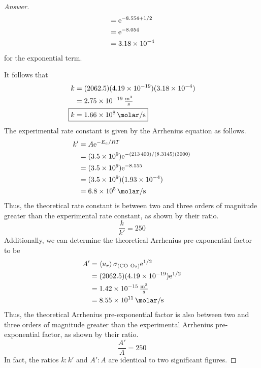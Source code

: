 \documentclass[../psets.tex]{subfiles}
\begin{document}
\begin{enumerate}[label={\textbf{30-\arabic*.}},leftmargin=3.5em]
\begin{proof}[Answer]
\begin{align*}
            &= \e[-\num{8.554}+1/2]\\
            &= \e[-\num{8.054}]\\
            &= \num{3.18e-4}
        \end{align*}
        for the exponential term.\par
        \pagebreak
        It follows that
        \begin{align*}
            k &= (\num{2062.5})(\num{4.19e-19})(\num{3.18e-4})\\
            &= \SI[per-mode=fraction,fraction-function=\tfrac]{2.75e-19}{\cubic\meter\per\second}\\
            \Aboxed{k &= \SI{1.66e8}{\per\molar\per\second}}
        \end{align*}
        The experimental rate constant is given by the Arrhenius equation as follows.
        \begin{align*}
            k' &= A\e[-E_a/RT]\\
            &= (\num{3.5e9})\e[-(\num{213400})/(\num{8.3145})(\num{3000})]\\
            &= (\num{3.5e9})\e[\num{-8.555}]\\
            &= (\num{3.5e9})(\num{1.93e-4})\\
            &= \SI{6.8e5}{\per\molar\per\second}
        \end{align*}
        Thus, the theoretical rate constant is between two and three orders of magnitude greater than the experimental rate constant, as shown by their ratio.
        \begin{equation*}
            \boxed{\frac{k}{k'} = 250}
        \end{equation*}
        Additionally, we can determine the theoretical Arrhenius pre-exponential factor to be
        \begin{align*}
            A' &= \prb{u_r}\sigma_{(\ce{CO}\ \ce{O2})}\e[1/2]\\
            &= (\num{2062.5})(\num{4.19e-19})\e[1/2]\\
            &= \SI[per-mode=fraction,fraction-function=\tfrac]{1.42e-15}{\cubic\meter\per\second}\\
            &= \SI{8.55e11}{\per\molar\per\second}
        \end{align*}
        Thus, the theoretical Arrhenius pre-exponential factor is also between two and three orders of magnitude greater than the experimental Arrhenius pre-exponential factor, as shown by their ratio.
        \begin{equation*}
            \boxed{\frac{A'}{A} = 250}
        \end{equation*}
        In fact, the ratios $k:k'$ and $A':A$ are identical to two significant figures.
    \end{proof}
\end{enumerate}
\end{document}
